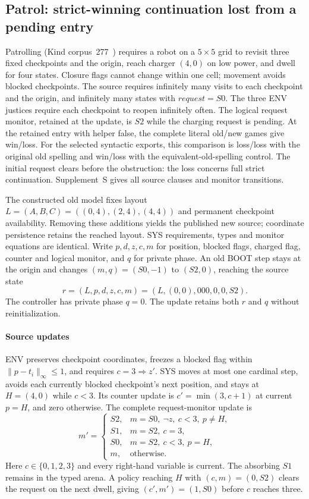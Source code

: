 \subsection{Patrol: strict-winning continuation lost from a pending entry}
\label{sec:patrol}\label{sec:preservation-evidence}

Patrolling (Kind corpus~277~\cite{kindartifact}) requires a robot on a
$5\times5$ grid to revisit three fixed checkpoints and the origin,
reach charger $(4,0)$ on low power, and dwell for four states. Closure
flags cannot change within one cell; movement avoids blocked checkpoints.
The source requires infinitely many visits to each checkpoint and the
origin, and infinitely many states with $\mathit{request}=S0$.
The three ENV justices require each checkpoint to reopen infinitely
often. The logical request monitor, retained at the update, is $S2$
while the charging request is pending. At the retained entry with helper
false, the complete literal old/new games give win/loss. For the selected
syntactic exports, this comparison is loss/loss with the original old
spelling and win/loss with the equivalent-old-spelling control. The initial
request clears before the obstruction: the loss concerns full strict
continuation. Supplement~S gives all source clauses
and monitor transitions.

The constructed old model fixes layout $L=(A,B,C)=((0,4),(2,4),(4,4))$
and permanent checkpoint availability. Removing these additions yields
the published new source; coordinate persistence retains the reached
layout. SYS requirements, types and monitor equations are identical.
Write $p,d,z,c,m$ for position, blocked flags, charged flag, counter and
logical monitor, and $q$ for private phase. An old BOOT step stays at the
origin and changes $(m,q)=(S0,-1)$ to $(S2,0)$, reaching the source state
\[
 r=(L,p,d,z,c,m)=(L,(0,0),000,0,0,S2).
\]
The controller has private phase $q=0$. The update retains both $r$ and
$q$ without reinitialization.

\paragraph{Source updates}
ENV preserves checkpoint coordinates, freezes a blocked flag within
$\|p-t_i\|_\infty\le1$, and requires $c=3\Rightarrow z'$.
SYS moves at most one cardinal step, avoids each currently blocked
checkpoint's next position, and stays at $H=(4,0)$ while $c<3$.
Its counter update is $c'=\min(3,c+1)$ at current $p=H$, and zero
otherwise. The complete request-monitor update is
\[
 m'=\begin{cases}
 S2,&m=S0,\ \neg z,\ c<3,\ p\ne H,\\
 S1,&m=S2,\ c=3,\\
 S0,&m=S2,\ c<3,\ p=H,\\
 m,&\text{otherwise}.
 \end{cases}
\]
Here $c\in\{0,1,2,3\}$ and every right-hand variable is current.
The absorbing $S1$ remains in the typed arena. A policy reaching $H$
with $(c,m)=(0,S2)$ clears the request on the next dwell, giving
$(c',m')=(1,S0)$ before $c$ reaches three.

